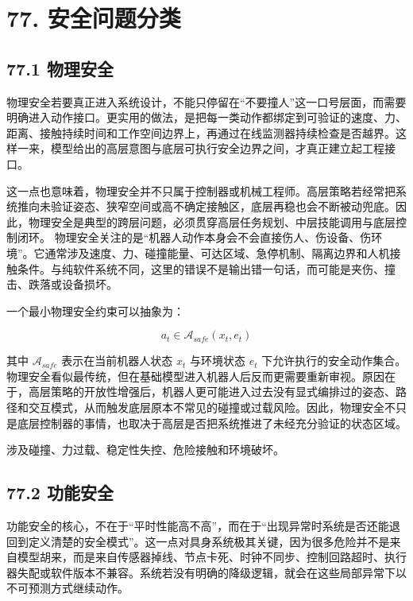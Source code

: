 \section*{77. 安全问题分类}

\subsection*{77.1 物理安全}


物理安全若要真正进入系统设计，不能只停留在“不要撞人”这一口号层面，而需要明确进入动作接口。更实用的做法，是把每一类动作都绑定到可验证的速度、力、距离、接触持续时间和工作空间边界上，再通过在线监测器持续检查是否越界。这样一来，模型给出的高层意图与底层可执行安全边界之间，才真正建立起工程接口。

这一点也意味着，物理安全并不只属于控制器或机械工程师。高层策略若经常把系统推向未验证姿态、狭窄空间或高不确定接触区，底层再稳也会不断被动兜底。因此，物理安全是典型的跨层问题，必须贯穿高层任务规划、中层技能调用与底层控制闭环。 物理安全关注的是“机器人动作本身会不会直接伤人、伤设备、伤环境”。它通常涉及速度、力、碰撞能量、可达区域、急停机制、隔离边界和人机接触条件。与纯软件系统不同，这里的错误不是输出错一句话，而可能是夹伤、撞击、跌落或设备损坏。

一个最小物理安全约束可以抽象为：

\begin{equation*}
a_t \in \mathcal{A}_{safe}(x_t, e_t)
\end{equation*}

其中 \(\mathcal{A}_{safe}\) 表示在当前机器人状态 \(x_t\) 与环境状态 \(e_t\) 下允许执行的安全动作集合。 物理安全看似最传统，但在基础模型进入机器人后反而更需要重新审视。原因在于，高层策略的开放性增强后，机器人更可能进入过去没有显式编排过的姿态、路径和交互模式，从而触发底层原本不常见的碰撞或过载风险。因此，物理安全不只是底层控制器的事情，也取决于高层是否把系统推进了未经充分验证的状态区域。

涉及碰撞、力过载、稳定性失控、危险接触和环境破坏。

\subsection*{77.2 功能安全}


功能安全的核心，不在于“平时性能高不高”，而在于“出现异常时系统是否还能退回到定义清楚的安全模式”。这一点对具身系统极其关键，因为很多危险并不是来自模型胡来，而是来自传感器掉线、节点卡死、时钟不同步、控制回路超时、执行器失配或软件版本不兼容。系统若没有明确的降级逻辑，就会在这些局部异常下以不可预测方式继续动作。

